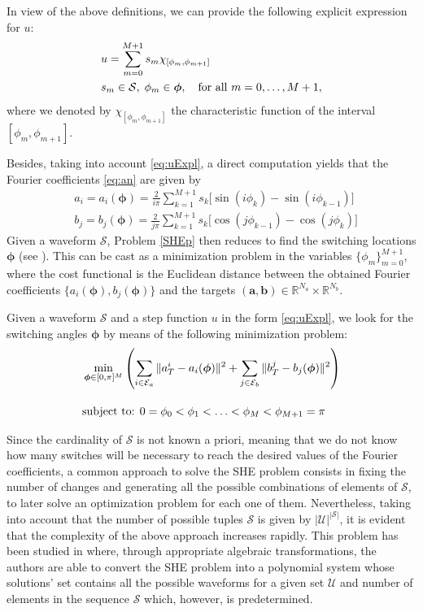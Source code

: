 In view of the above definitions, we can provide the following explicit expression for $u$:
\begin{align}\label{eq:uExpl}
	&u = \sum_{m=0}^{M+1} s_m\chi_{[\phi_m,\phi_{m+1}]}
	\\
	&s_m\in\mathcal S, \;\phi_m\in{\bm{\phi}}, \quad \mbox{for all } m=0,\ldots,M+1, \notag 
\end{align}
where we denoted by $\chi_{[\phi_m,\phi_{m+1}]}$ the characteristic function of the interval $[\phi_m,\phi_{m+1}]$.

Besides, taking into account \eqref{eq:uExpl}, a direct computation yields that the Fourier coefficients \eqref{eq:an} are given by
\begin{align*}
	& a_i = a_i(\bm{\phi}) =  \frac{2}{i\pi} \sum_{k=1}^{M+1} s_k \Big[\sin(i\phi_k) -\sin(i\phi_{k-1})\Big]
	\\
	& b_j = b_j(\bm{\phi}) = \frac{2}{j\pi} \sum_{k=1}^{M+1} s_k \Big[\cos(j\phi_{k-1}) -\cos(j\phi_{k})\Big]
\end{align*}
Given a waveform $\mathcal S$, Problem \ref{SHEp} then reduces to find the switching locations $\bm{\phi}$ (see \cite{Yang2015,Konstantinou2010,Sun1996}). This can be cast as a minimization problem in the variables $\{\phi_m\}_{m=0}^{M+1}$, where the cost functional is the Euclidean distance between the obtained Fourier coefficients $\{a_i(\bm{\phi}),b_j(\bm{\phi})\}$ and the targets $(\bm{a},\bm{b})\in \mathbb{R}^{N_a}\times \mathbb{R}^{N_b}$.
\newline
\begin{problem}
Given a waveform $\mathcal S$ and a step function $u$ in the form \eqref{eq:uExpl}, we look for the switching angles $\bm{\phi}$ by means of the following minimization problem:
\begin{align}
	&\min_{\bm{\phi} \in [0,\pi]^{M}} \left(\sum_{i\in\mathcal{E}_a} \|a_T^i - a_i(\bm{\phi})\|^2 + \sum_{j\in \mathcal{E}_b} \|b_T^j - b_j(\bm{\phi})\|^2\right)\notag 
	\\[10pt]
	&\mbox{subject to: } 0 = \phi_0 <\phi_1 < \ldots < \phi_{M} < \phi_{M+1} = \pi \notag 
	\\
\end{align}
\end{problem}

Since the cardinality of $\mathcal S$ is not known a priori, meaning that we do not know how many switches will be necessary to reach the desired values of the Fourier coefficients, a common approach to solve the SHE problem consists in fixing the number of changes and generating all the possible combinations of elements of $\mathcal S$, to later solve an optimization problem for each one of them. Nevertheless, taking into account that the number of possible tuples $\mathcal S$ is given by $|\mathcal{U}|^{|\mathcal S|}$, it is evident that the complexity of the above approach increases rapidly.
%
This problem has been studied in \cite{Yang2015} where, through appropriate algebraic transformations, the authors are able to convert the SHE problem into a polynomial system whose solutions' set contains all the possible waveforms for a given set $\mathcal{U}$ and number of elements in the sequence $\mathcal S$ which, however, is predetermined. 
%

